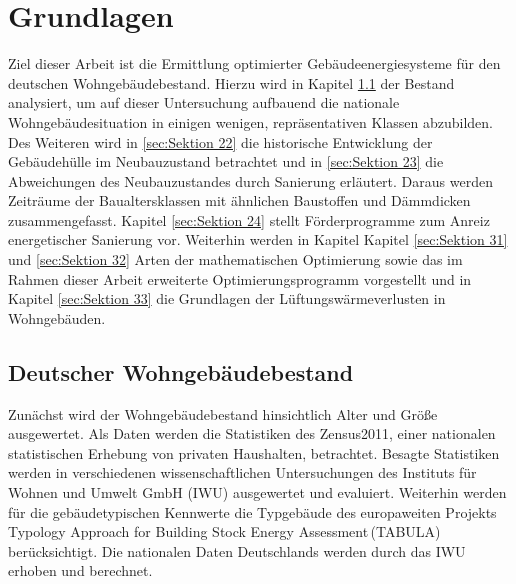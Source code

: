 \chapter{Grundlagen}

Ziel dieser Arbeit ist die Ermittlung optimierter Gebäudeenergiesysteme für den deutschen Wohngebäudebestand.
Hierzu wird in Kapitel \ref{sec:Sektion 21} der Bestand analysiert, um auf dieser Untersuchung aufbauend die nationale Wohngebäudesituation in einigen wenigen, repräsentativen Klassen abzubilden. 
Des Weiteren wird in \ref{sec:Sektion 22} die historische Entwicklung der Gebäudehülle im Neubauzustand betrachtet und in \ref{sec:Sektion 23} die Abweichungen des Neubauzustandes durch Sanierung erläutert. Daraus werden Zeiträume der Baualtersklassen mit ähnlichen Baustoffen und Dämmdicken zusammengefasst. 
Kapitel \ref{sec:Sektion 24} stellt Förderprogramme zum Anreiz energetischer Sanierung vor.
Weiterhin werden in Kapitel Kapitel \ref{sec:Sektion 31} und \ref{sec:Sektion 32} Arten der mathematischen Optimierung sowie das im Rahmen dieser Arbeit erweiterte Optimierungsprogramm vorgestellt und in Kapitel \ref{sec:Sektion 33} die Grundlagen der Lüftungswärmeverlusten in Wohngebäuden. 

\section{Deutscher Wohngebäudebestand}
\label{sec:Sektion 21}

Zunächst wird der Wohngebäudebestand hinsichtlich Alter und Größe ausgewertet.
Als Daten werden die Statistiken des Zensus2011, einer nationalen statistischen Erhebung von privaten Haushalten, betrachtet. 
Besagte Statistiken werden in verschiedenen wissenschaftlichen Untersuchungen des Instituts für Wohnen und Umwelt GmbH (IWU) ausgewertet und evaluiert.
Weiterhin werden für die gebäudetypischen Kennwerte die Typgebäude des europaweiten Projekts \glqq Typology Approach for Building Stock Energy Assessment\grqq\,(TABULA) berücksichtigt. Die nationalen Daten Deutschlands werden durch das IWU erhoben und berechnet.


